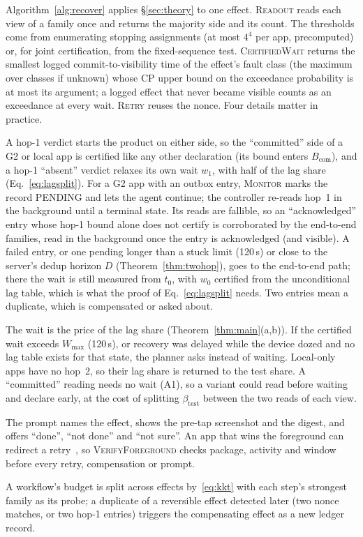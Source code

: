 Algorithm~\ref{alg:recover} applies \S\ref{sec:theory} to one effect. \textsc{Readout} reads each view of a family once and returns the majority side and its count.
The thresholds come from enumerating stopping assignments (at most $4^4$ per app, precomputed) or, for joint certification, from the fixed-sequence test. \textsc{CertifiedWait} returns
the smallest logged commit-to-visibility time of the effect's fault class (the maximum over classes if unknown) whose CP upper bound on the exceedance probability is at most
its argument; a logged effect that never became visible counts as an exceedance at every wait. \textsc{Retry} reuses the nonce. Four details matter in practice.

 A hop-1 verdict starts the product on either side, so the ``committed'' side of a G2 or local app is certified like any other declaration
(its bound enters $B_{\mathrm{com}}$), and a hop-1 ``absent'' verdict relaxes its own wait $w_1$, with half of the lag share (Eq.~\eqref{eq:lagsplit}). For a G2 app with an outbox entry,
\textsc{Monitor} marks the record \textsf{PENDING} and lets the agent continue; the controller re-reads hop~1 in the background until a terminal state. Its reads are fallible, so an
``acknowledged'' entry whose hop-1 bound alone does not certify is corroborated by the end-to-end families, read in the background once the entry is acknowledged (and visible).
A failed entry, or one pending longer than a stuck limit (120\,s) or close to the server's dedup horizon $D$ (Theorem~\ref{thm:twohop}), goes to the end-to-end path; there the wait is still measured from $t_0$, with $w_0$ certified from the
unconditional lag table, which is what the proof of Eq.~\eqref{eq:lagsplit} needs. Two entries mean a duplicate, which is compensated or asked about.

 The wait is the price of the lag share (Theorem~\ref{thm:main}(a,b)). If the certified wait exceeds $W_{\max}$ (120\,s), or recovery was delayed while the device
dozed and no lag table exists for that state, the planner asks instead of waiting. Local-only apps have no hop~2, so their lag share is returned to the test share. A ``committed''
reading needs no wait (A1), so a variant could read before waiting and declare early, at the cost of splitting $\beta_{\mathrm{test}}$ between the two reads of each view.

 The prompt names the effect, shows the pre-tap screenshot and the digest, and offers ``done'', ``not done'' and ``not sure''. An app that wins
the foreground can redirect a retry~\cite{qian2026rebinding}, so \textsc{VerifyForeground} checks package, activity and window before every retry, compensation or prompt.

 A workflow's budget is split across effects by~\eqref{eq:kkt} with each step's strongest family as its probe; a duplicate of a reversible effect detected
later (two nonce matches, or two hop-1 entries) triggers the compensating effect as a new ledger record.
